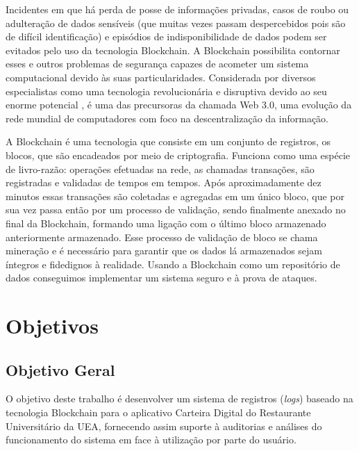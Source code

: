 Incidentes em que há perda de posse de informações privadas, casos de roubo ou adulteração de dados sensíveis (que muitas vezes passam despercebidos pois são de difícil identificação) e episódios de indisponibilidade de dados podem ser evitados pelo uso da tecnologia Blockchain. A Blockchain possibilita contornar esses e outros problemas de segurança capazes de acometer um sistema computacional devido às suas particularidades. Considerada por diversos especialistas como uma tecnologia revolucionária e disruptiva devido ao seu enorme potencial \cite{Ejeke2022}, é uma das precursoras da chamada Web 3.0, uma evolução da rede mundial de computadores com foco na descentralização da informação.

A Blockchain é uma tecnologia que consiste em um conjunto de registros, os blocos, que são encadeados por meio de criptografia. Funciona como uma espécie de livro-razão: operações efetuadas na rede, as chamadas transações, são registradas e validadas de tempos em tempos. Após aproximadamente dez minutos essas transações são coletadas e agregadas em um único bloco, que por sua vez passa então por um processo de validação, sendo finalmente anexado no final da Blockchain, formando uma ligação com o último bloco armazenado anteriormente armazenado. Esse processo de validação de bloco se chama mineração e é necessário para garantir que os dados lá armazenados sejam íntegros e fidedignos à realidade. Usando a Blockchain como um repositório de dados conseguimos implementar um sistema seguro e à prova de ataques.


\section{Objetivos}

\subsection{Objetivo Geral}

O objetivo deste trabalho é desenvolver um sistema de registros (\emph{logs}) baseado na tecnologia Blockchain para o aplicativo Carteira Digital do Restaurante Universitário da UEA, fornecendo assim suporte à auditorias e análises do funcionamento do sistema em face à utilização por parte do usuário.

